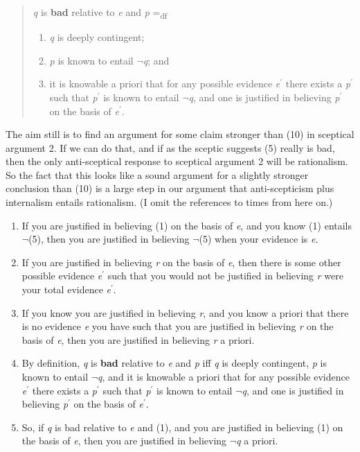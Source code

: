 \documentclass[
  11pt,
  letterpaper,
  DIV=11,
  numbers=noendperiod,
  oneside]{scrartcl}
\begin{document}
\begin{quote}
\emph{q} is \textbf{bad} relative to \emph{e} and \emph{p}
=\textsubscript{df}

\begin{enumerate}
\def\labelenumi{\arabic{enumi}.}
\item
  \emph{q} is deeply contingent;
\item
  \emph{p} is known to entail \(\neg\)\emph{q}; and
\item
  it is knowable a priori that for any possible evidence
  \emph{e}\(^\prime\) there exists a \emph{p}\(^\prime\) such that
  \emph{p}\(^\prime\) is known to entail \(\neg\)\emph{q}, and one is
  justified in believing \emph{p}\(^\prime\) on the basis of
  \emph{e}\(^\prime\).
\end{enumerate}
\end{quote}

The aim still is to find an argument for some claim stronger than (10)
in sceptical argument 2. If we can do that, and if as the sceptic
suggests (5) really is bad, then the only anti-sceptical response to
sceptical argument 2 will be rationalism. So the fact that this looks
like a sound argument for a slightly stronger conclusion than (10) is a
large step in our argument that anti-scepticism plus internalism entails
rationalism. (I omit the references to times from here on.)

\begin{enumerate}
\def\labelenumi{\arabic{enumi}.}
\setcounter{enumi}{11}
\item
  If you are justified in believing (1) on the basis of \emph{e}, and
  you know (1) entails \(\neg\)(5), then you are justified in believing
  \(\neg\)(5) when your evidence is \emph{e}.
\item
  If you are justified in believing \emph{r} on the basis of \emph{e},
  then there is some other possible evidence \emph{e}\(^\prime\) such
  that you would not be justified in believing \emph{r} were your total
  evidence \emph{e}\(^\prime\).
\item
  If you know you are justified in believing \emph{r}, and you know a
  priori that there is no evidence \emph{e} you have such that you are
  justified in believing \emph{r} on the basis of \emph{e}, then you are
  justified in believing \emph{r} a priori.
\item
  By definition, \emph{q} is \textbf{bad} relative to \emph{e} and
  \emph{p} iff \emph{q} is deeply contingent, \emph{p} is known to
  entail \(\neg\)\emph{q}, and it is knowable a priori that for any
  possible evidence \emph{e}\(^\prime\) there exists a
  \emph{p}\(^\prime\) such that \emph{p}\(^\prime\) is known to entail
  \(\neg\)\emph{q}, and one is justified in believing
  \emph{p}\(^\prime\) on the basis of \emph{e}\(^\prime\).
\item
  So, if \emph{q} is bad relative to \emph{e} and (1), and you are
  justified in believing (1) on the basis of \emph{e}, then you are
  justified in believing \(\neg\)\emph{q} a priori.
\end{enumerate}
\end{document}

